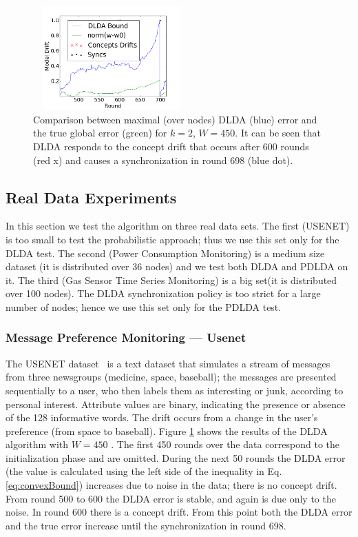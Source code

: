 \begin{figure}
	\centering
	\includegraphics[width=60mm, height=4cm]{Usenet/DriftDetected.png}
	\caption{Comparison between maximal (over nodes) DLDA (blue)
	error and the true global error (green) for $k=2$, $W=450$.
	It can be seen that DLDA responds to the concept drift that occurs
	after 600 rounds (red x) and causes a synchronization in round 698 (blue dot).}
	\label{usenet}
	\end{figure}
\subsection{Real Data Experiments}
In this section we test the algorithm on three real data sets. The first
(USENET) is too small to test the probabilistic approach; thus we use this set only for the DLDA test.
The second (Power Consumption Monitoring) is a medium size dataset (it
is distributed over 36 nodes) and we test both DLDA and PDLDA on it.
The third (Gas Sensor Time Series Monitoring) is a big set(it is distributed over
100 nodes). The DLDA synchronization policy is too strict for a large number of nodes; hence we use this set only for the PDLDA test.

\subsubsection{Message Preference Monitoring --- Usenet}
The USENET dataset~\cite{usenet} is a text dataset that simulates a stream of messages from three newsgroups (medicine, space, baseball); the messages are presented sequentially to a user, who then labels them as interesting or junk, according to personal interest. Attribute values are binary, indicating the presence or absence of the 128 informative words. The drift occurs from a change in the user's
preference (from space to baseball). Figure \ref{usenet} shows the results of
the DLDA algorithm with $W=450$ . The first 450 rounds over the data correspond to
the initialization phase and are omitted. During the next 50 rounds the DLDA error
(the value is calculated using the left side of the inequality in Eq.
\ref{eq:convexBound}) increases due to noise in the data; there is
no concept drift. From round 500 to 600 the DLDA error is stable,
and again is due only to the noise. In round 600 there is a concept
drift.
From this point both the DLDA error and the true error increase until the
synchronization in round 698.
